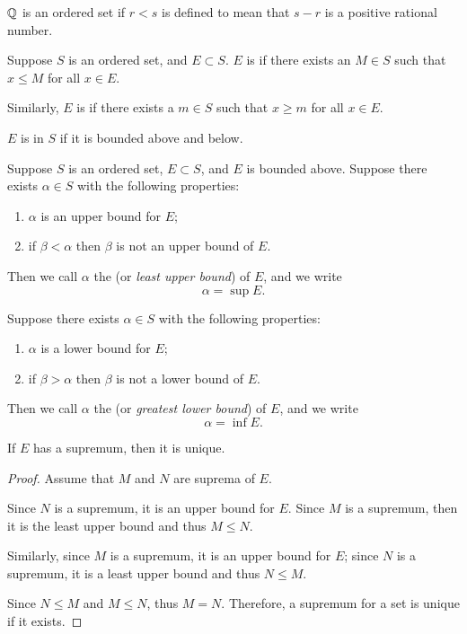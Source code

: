 \begin{example}
$\mathbb Q$ is an ordered set if $r<s$ is defined to mean that $s-r$ is a positive rational number.
\end{example}

\begin{definition}
Suppose $S$ is an ordered set, and $E\subset S$. $E$ is  if there exists an  $M\in S$ such that $x \le M$ for all $x\in E$.

Similarly, $E$ is  if there exists a  $m\in S$ such that $x\ge m$ for all $x\in E$.

$E$ is  in $S$ if it is bounded above and below.
\end{definition}

\begin{definition}
Suppose $S$ is an ordered set, $E\subset S$, and $E$ is bounded above. Suppose there exists $\alpha\in S$ with the following properties:
\begin{enumerate}[label=(\roman*)]
\item $\alpha$ is an upper bound for $E$;
\item if $\beta<\alpha$ then $\beta$ is not an upper bound of $E$.
\end{enumerate}
Then we call $\alpha$ the  (or \emph{least upper bound}) of $E$, and we write
\[ \alpha=\sup E. \]
\end{definition}

\begin{definition}
Suppose there exists $\alpha\in S$ with the following properties:
\begin{enumerate}[label=(\roman*)]
\item $\alpha$ is a lower bound for $E$;
\item if $\beta>\alpha$ then $\beta$ is not a lower bound of $E$.
\end{enumerate}
Then we call $\alpha$ the  (or \emph{greatest lower bound}) of $E$, and we write
\[ \alpha=\inf E. \]
\end{definition}

\begin{proposition}
If $E$ has a supremum, then it is unique.
\end{proposition}

\begin{proof}
Assume that $M$ and $N$ are suprema of $E$.

Since $N$ is a supremum, it is an upper bound for $E$. Since $M$ is a supremum, then it is the least upper bound and thus $M \le N$. 

Similarly, since $M$ is a supremum, it is an upper bound for $E$; since $N$ is a supremum, it is a least upper bound and thus $N \le M$.

Since $N \le M$ and $M \le N$, thus $M=N$. Therefore, a supremum for a set is unique if it exists.
\end{proof}

